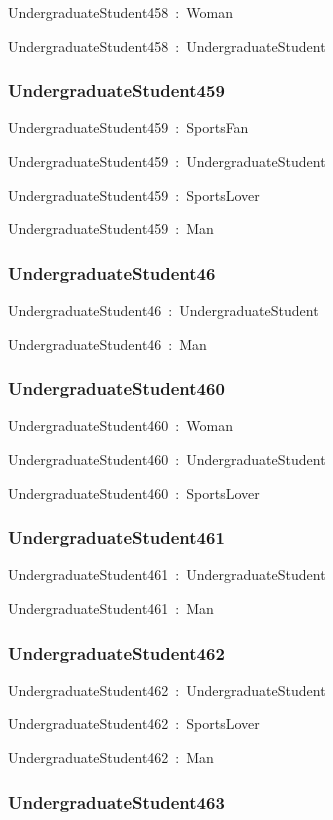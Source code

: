 \documentclass{article}
\begin{document}
UndergraduateStudent458~:~Woman

UndergraduateStudent458~:~UndergraduateStudent

\subsubsection*{UndergraduateStudent459}

UndergraduateStudent459~:~SportsFan

UndergraduateStudent459~:~UndergraduateStudent

UndergraduateStudent459~:~SportsLover

UndergraduateStudent459~:~Man

\subsubsection*{UndergraduateStudent46}

UndergraduateStudent46~:~UndergraduateStudent

UndergraduateStudent46~:~Man

\subsubsection*{UndergraduateStudent460}

UndergraduateStudent460~:~Woman

UndergraduateStudent460~:~UndergraduateStudent

UndergraduateStudent460~:~SportsLover

\subsubsection*{UndergraduateStudent461}

UndergraduateStudent461~:~UndergraduateStudent

UndergraduateStudent461~:~Man

\subsubsection*{UndergraduateStudent462}

UndergraduateStudent462~:~UndergraduateStudent

UndergraduateStudent462~:~SportsLover

UndergraduateStudent462~:~Man

\subsubsection*{UndergraduateStudent463}
\end{document}
